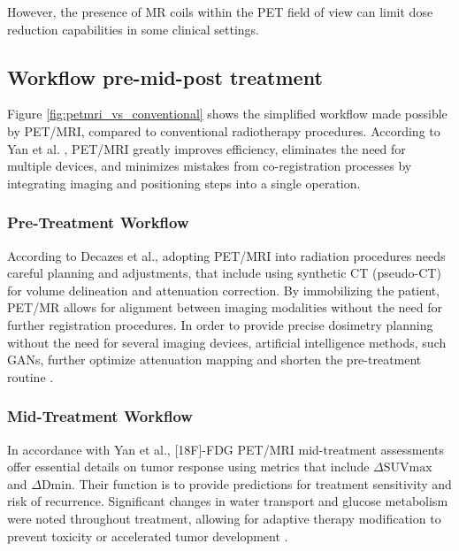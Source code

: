 \documentclass[11pt]{article} %
\begin{document}
\begin{multicols}{2}
However, the presence of MR coils within the PET field of view can limit dose reduction capabilities in some clinical settings.

\subsection{Workflow pre-mid-post treatment}
Figure \ref{fig:petmri_vs_conventional} shows the simplified workflow made possible by PET/MRI, compared to conventional radiotherapy procedures. According to Yan et al. \cite{yan2024}, PET/MRI greatly improves efficiency, eliminates the need for multiple devices, and minimizes mistakes from co-registration processes by integrating imaging and positioning steps into a single operation.


\subsubsection{Pre-Treatment Workflow}

According to Decazes et al., adopting PET/MRI into radiation procedures needs careful planning and adjustments, that include using synthetic CT (pseudo-CT) for volume delineation and attenuation correction. By immobilizing the patient, PET/MR allows for alignment between imaging modalities without the need for further registration procedures. In order to provide precise dosimetry planning without the need for several imaging devices, artificial intelligence methods, such GANs, further optimize attenuation mapping and shorten the pre-treatment routine \cite{decazes2021}.


\subsubsection{Mid-Treatment Workflow}

In accordance with Yan et al., [18F]-FDG PET/MRI mid-treatment assessments offer essential details on tumor response using metrics that include $\Delta \text{SUVmax}$ and $\Delta \text{Dmin}$. Their function is to provide predictions for treatment sensitivity and risk of recurrence. Significant changes in water transport and glucose metabolism were noted throughout treatment, allowing for adaptive therapy modification to prevent toxicity or accelerated tumor development \cite{yan2024}.

\end{multicols}
\end{document}
